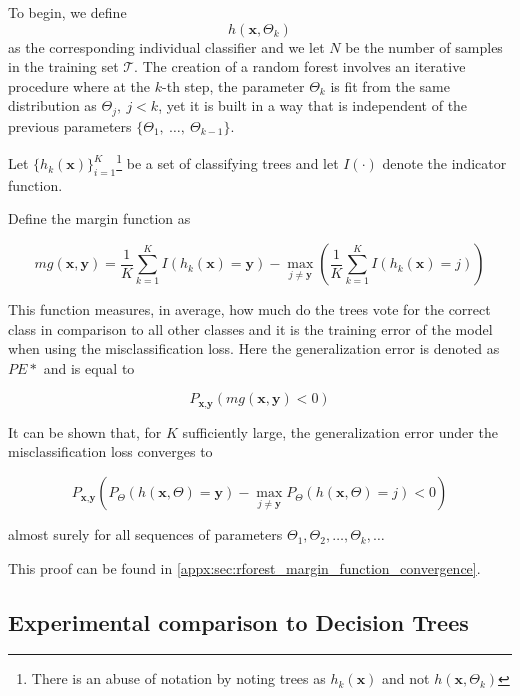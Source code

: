 To begin, we define
$$h(\textbf{x},\Theta_k)$$ as the corresponding individual classifier and we let $N$ be the number of samples in the training set $\mathcal{T}$.
The creation of a random forest involves an iterative procedure where at the $k$-th step, the parameter $\Theta_k$ is fit from the same distribution as $\Theta_j, \ j<k$, yet it is built in a way that is independent of the previous parameters $\{\Theta_1, \ \ldots, \ \Theta_{k-1} \}$. %


Let $\{ h_k(\textbf{x}) \}_{i=1}^K$\footnote{There is an abuse of notation by noting trees as $h_k(\textbf{x})$ and not $h(\textbf{x}, \Theta_k)$ } be a set of classifying trees and let $I(\cdot)$ denote the indicator function.

Define the margin function as

\begin{equation}
\label{eq:rf-marginFun}
mg(\textbf{x},\textbf{y}) = \frac{1}{K}  \sum_{k=1}^K I(h_k(\textbf{x}) = \textbf{y})
- \max_{j\neq \textbf{y}}\left(\frac{1}{K} \sum_{k=1}^K I(h_k(\textbf{x}) = j) \right)
\end{equation}


This function measures, in average, how much do the trees vote for the correct class in comparison to all other classes and it is the training error of the model when using the misclassification loss.
Here the generalization error is denoted as $PE*$ and is equal to

\begin{equation}
P_{\textbf{x}, \textbf{y} }(mg(\textbf{x},\textbf{y}) <0)
\end{equation}

 It can be shown that, for $K$ sufficiently large, the generalization error under the misclassification loss converges to

\begin{equation}
 P_{\textbf{x}, \textbf{y} } ( P_{\Theta} (h(\textbf{x}, \Theta) = \textbf{y}) - \max_{j \neq \textbf{y}} P_{\Theta} (h(\textbf{x}, \Theta) = j) < 0)
 \end{equation}

almost surely for all sequences of parameters $\Theta_1,\Theta_2, \ldots, \Theta_k,\ldots$

This proof can be found in \cref{appx:sec:rforest_margin_function_convergence}.


\subsection{ Experimental comparison to Decision Trees}\label{subsection:random_forests_comparison_trees}

